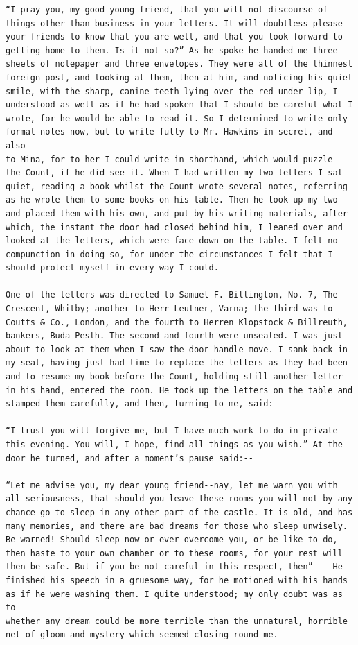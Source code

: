 \documentclass{article}
\begin{document}
\begin{verbatim}
“I pray you, my good young friend, that you will not discourse of
things other than business in your letters. It will doubtless please
your friends to know that you are well, and that you look forward to
getting home to them. Is it not so?” As he spoke he handed me three
sheets of notepaper and three envelopes. They were all of the thinnest
foreign post, and looking at them, then at him, and noticing his quiet
smile, with the sharp, canine teeth lying over the red under-lip, I
understood as well as if he had spoken that I should be careful what I
wrote, for he would be able to read it. So I determined to write only
formal notes now, but to write fully to Mr. Hawkins in secret, and also
to Mina, for to her I could write in shorthand, which would puzzle
the Count, if he did see it. When I had written my two letters I sat
quiet, reading a book whilst the Count wrote several notes, referring
as he wrote them to some books on his table. Then he took up my two
and placed them with his own, and put by his writing materials, after
which, the instant the door had closed behind him, I leaned over and
looked at the letters, which were face down on the table. I felt no
compunction in doing so, for under the circumstances I felt that I
should protect myself in every way I could.

One of the letters was directed to Samuel F. Billington, No. 7, The
Crescent, Whitby; another to Herr Leutner, Varna; the third was to
Coutts & Co., London, and the fourth to Herren Klopstock & Billreuth,
bankers, Buda-Pesth. The second and fourth were unsealed. I was just
about to look at them when I saw the door-handle move. I sank back in
my seat, having just had time to replace the letters as they had been
and to resume my book before the Count, holding still another letter
in his hand, entered the room. He took up the letters on the table and
stamped them carefully, and then, turning to me, said:--

“I trust you will forgive me, but I have much work to do in private
this evening. You will, I hope, find all things as you wish.” At the
door he turned, and after a moment’s pause said:--

“Let me advise you, my dear young friend--nay, let me warn you with
all seriousness, that should you leave these rooms you will not by any
chance go to sleep in any other part of the castle. It is old, and has
many memories, and there are bad dreams for those who sleep unwisely.
Be warned! Should sleep now or ever overcome you, or be like to do,
then haste to your own chamber or to these rooms, for your rest will
then be safe. But if you be not careful in this respect, then”----He
finished his speech in a gruesome way, for he motioned with his hands
as if he were washing them. I quite understood; my only doubt was as to
whether any dream could be more terrible than the unnatural, horrible
net of gloom and mystery which seemed closing round me.


\end{verbatim}
\end{document}
